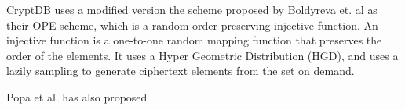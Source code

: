 CryptDB uses a modified version the scheme proposed by Boldyreva et. al \citep{ope_cryptdb} as their OPE scheme, which is a random order-preserving injective function. An injective function is a one-to-one random mapping function that preserves the order of the elements. It uses a Hyper Geometric Distribution (HGD), and uses a lazily sampling to generate ciphertext elements from the set on demand.


Popa et al. has also proposed 




%
%



